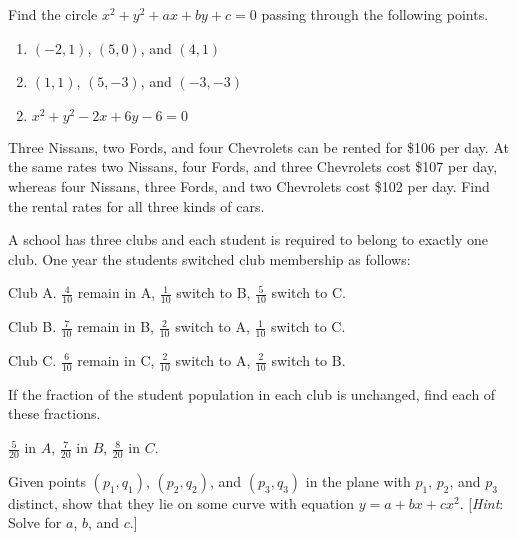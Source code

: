 \begin{multicols}{2}
\begin{ex}
Find the circle $x^2 + y^2 + ax + by + c = 0$ passing through the following points.

\begin{enumerate}[label={\alph*.}]
\item $(-2, 1)$, $(5, 0)$, and $(4, 1)$

\item $(1, 1)$, $(5, -3)$, and $(-3, -3)$

\end{enumerate}
\begin{sol}
\begin{enumerate}[label={\alph*.}]
\setcounter{enumi}{1}
\item  $ x^2 + y^2 - 2x + 6y - 6 = 0 $

\end{enumerate}
\end{sol}
\end{ex}

\begin{ex}
Three Nissans, two Fords, and four Chevrolets can be rented for \$106 per day. At the same rates two Nissans, four Fords, and three Chevrolets cost \$107 per day, whereas four Nissans, three Fords, and two Chevrolets cost \$102 per day. Find the rental rates for all three kinds of cars.
\end{ex}

\begin{ex}
A school has three clubs and each student is required to belong to exactly one club. One year the students switched club membership as follows:

\noindent Club A. $ \frac{4}{10} $  remain in A, $ \frac{1}{10} $ switch to B, $ \frac{5}{10} $ switch to C.

\noindent Club B. $ \frac{7}{10} $ remain in B, $ \frac{2}{10}$ switch to A, $ \frac{1}{10} $ switch to C.

\noindent Club C. $ \frac{6}{10} $ remain in C, $ \frac{2}{10} $ switch to A, $ \frac{2}{10} $ switch to B.

If the fraction of the student population in each club is unchanged, find each of these fractions.

\begin{sol}
$ \frac{5}{20} $ in $A$, $\frac{7}{20}$ in $B$, $\frac{8}{20}$ in $C$.
\end{sol}
\end{ex}

\begin{ex}
Given points $(p_1, q_1)$, $(p_2, q_2)$, and $(p_3, q_3)$ in the plane with $p_1$, $p_2$, and $p_3$ distinct, show that they lie on some curve with equation $y = a + bx + cx^2$. [\textit{Hint}: Solve for $a$, $b$, and $c$.]
\end{ex}


\end{multicols}
